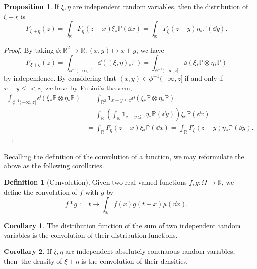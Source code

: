\documentclass[]{article}
\theoremstyle{definition}
\newtheorem{corollary}{Corollary}[theorem]
\theoremstyle{definition}
\newtheorem{definition}{Definition}[section]
\newtheorem{proposition}{Proposition}[section]
\begin{document}
\begin{proposition}
  If \(\xi, \eta\) are independent random variables, then the distribution of 
  \(\xi + \eta\) is 
  \[F_{\xi + \eta}(z) = 
    \int_{\mathbb{R}} F_\eta(z - x) \xi_*\mathbb{P}(\dd x) =
    \int_{\mathbb{R}} F_\xi(z - y) \eta_*\mathbb{P}(\dd y).\]
\end{proposition}
\begin{proof}
  By taking \(\phi : \mathbb{R}^2 \to \mathbb{R} : (x, y) \mapsto x + y\), we have 
  \[F_{\xi + \eta}(z) = \int_{\phi^{-1}(-\infty, z]} \dd ((\xi, \eta)_* \mathbb{P})
   = \int_{\phi^{-1}(-\infty, z]} \dd (\xi_* \mathbb{P} \otimes \eta_* \mathbb{P})\]
  by independence. By considering that \((x, y) \in \phi^{-1}(-\infty, z]\) if and only 
  if \(x + y \le < z\), we have by Fubini's theorem,
  \[\begin{split}
    \int_{\phi^{-1}(-\infty, z]} \dd (\xi_* \mathbb{P} \otimes \eta_* \mathbb{P}) & = 
    \int_{\mathbb{R}^2} \mathbf{1}_{x + y \le z} \dd (\xi_* \mathbb{P} \otimes \eta_* \mathbb{P})\\
    & = \int_{\mathbb{R}} \left(\int_{\mathbb{R}} \mathbf{1}_{x + y \le z} \eta_*\mathbb{P}(\dd y)\right) \xi_*\mathbb{P}(\dd x)\\
    & = \int_{\mathbb{R}} F_\eta(z - x) \xi_*\mathbb{P}(\dd x) 
      = \int_{\mathbb{R}} F_\xi(z - y) \eta_*\mathbb{P}(\dd y). 
  \end{split}\]
\end{proof}

Recalling the definition of the convolution of a function, we may reformulate the 
above as the following corollaries.

\begin{definition}[Convolution]
  Given two real-valued functions \(f, g : \Omega \to \mathbb{R}\), we define the
  convolution of \(f\) with \(g\) by 
  \[f * g := t \mapsto \int_{\mathbb{R}} f(x) g(t - x) \mu(\dd x).\]
\end{definition}

\begin{corollary}
  The distribution function of the sum of two independent random variables is 
  the convolution of their distribution functions.
\end{corollary}

\begin{corollary}
  If \(\xi, \eta\) are independent absolutely continuous random variables, then,
  the density of \(\xi + \eta\) is the convolution of their densities.
\end{corollary}
\end{document}

